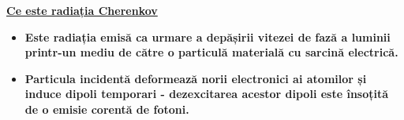 \documentclass[10pt]{beamer}
\begin{document}
\begin{frame}{\textbf{\underline{Ce este radiația Cherenkov}}}
\begin{itemize}

\vspace{-3cm}
   \item \makebox[0.5cm]{} \textbf{Este radiația emisă ca urmare a depășirii vitezei de fază a luminii printr-un mediu de către o particulă materială cu sarcină electrică.}\\
   \item \makebox[0.5cm]{} \textbf{Particula incidentă deformează norii electronici ai atomilor și induce dipoli temporari - dezexcitarea acestor dipoli este însoțită de o emisie corentă de fotoni.}\\

\end{itemize}



\end{frame}
\end{document}
